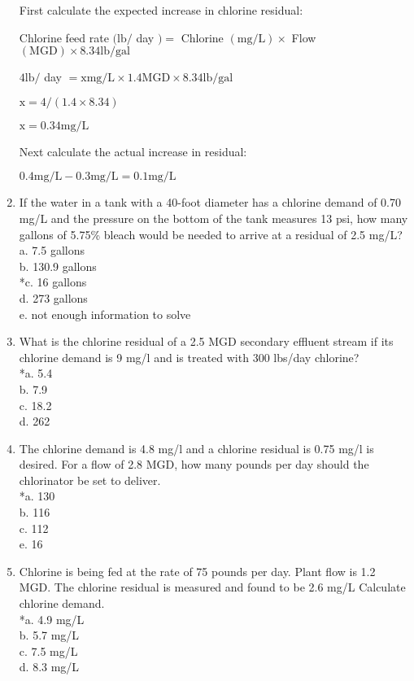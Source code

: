 \documentclass{article}
\begin{document}
\begin{enumerate}
First calculate the expected increase in chlorine residual:

Chlorine feed rate $(\mathrm{lb} /$ day $)=$ Chlorine $(\mathrm{mg} / \mathrm{L}) \times$ Flow $(\mathrm{MGD}) \times 8.34 \mathrm{lb} / \mathrm{gal}$

$4 \mathrm{lb} /$ day $=\mathrm{x} \mathrm{mg} / \mathrm{L} \times 1.4 \mathrm{MGD} \times 8.34 \mathrm{lb} / \mathrm{gal}$

$\mathrm{x}=4 /(1.4 \times 8.34)$

$\mathrm{x}=0.34 \mathrm{mg} / \mathrm{L}$

Next calculate the actual increase in residual:

$0.4 \mathrm{mg} / \mathrm{L}-0.3 \mathrm{mg} / \mathrm{L}=0.1 \mathrm{mg} / \mathrm{L}$

\item If the water in a tank with a 40-foot diameter has a chlorine demand of 0.70 mg/L and the pressure on the bottom of the tank measures 13 psi, how many gallons of 5.75\% bleach would be needed to arrive at a residual of 2.5 mg/L?\\
a.	7.5 gallons\\
b.	130.9  gallons\\
*c.	16 gallons\\
d.	273 gallons\\
e.	not enough information to solve



\item What is the chlorine residual of a 2.5 MGD secondary effluent stream if its chlorine demand is 9 mg/l and is treated with 300 lbs/day chlorine?\\
*a. 5.4\\
b. 7.9\\
c. 18.2\\
d. 262


\item The chlorine demand is 4.8 mg/l and a chlorine residual is 0.75 mg/l is desired.  For a flow of 2.8 MGD, how many pounds per day should the chlorinator be set to deliver.\\

*a. 130 \\
b. 116 \\
c. 112 \\
e. 16 \\


\item Chlorine is being fed at the rate of 75 pounds per day. Plant flow is 1.2 MGD. The chlorine residual is measured and found to be 2.6 mg/L Calculate chlorine demand.\\
*a. 4.9 mg/L\\ 
b. 5.7 mg/L \\
c. 7.5 mg/L \\
d. 8.3 mg/L 


\end{enumerate}
\end{document}
